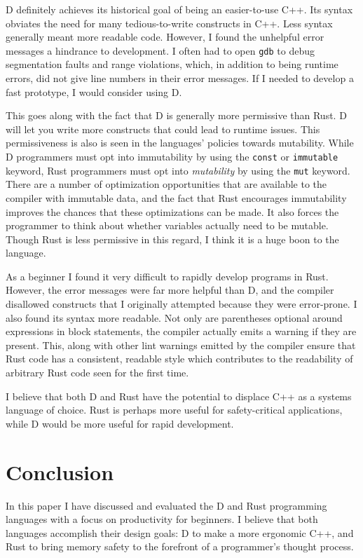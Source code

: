 \documentclass[finalcopy]{srpaper}
\begin{document}
D definitely achieves its historical goal of being an easier-to-use C++. Its
syntax obviates the need for many tedious-to-write constructs in C++. Less
syntax generally meant more readable code. However, I found the unhelpful error
messages a hindrance to development. I often had to open \texttt{gdb} to debug
segmentation faults and range violations, which, in addition to being runtime
errors, did not give line numbers in their error messages. If I needed to
develop a fast prototype, I would consider using D.

This goes along with the fact that D is generally more permissive than Rust. D
will let you write more constructs that could lead to runtime issues. This
permissiveness is also is seen in the languages' policies towards mutability.
While D programmers must opt into immutability by using the \texttt{const} or
\texttt{immutable} keyword, Rust programmers must opt into \textit{mutability}
by using the \texttt{mut} keyword. There are a number of optimization
opportunities that are available to the compiler with immutable data, and the
fact that Rust encourages immutability improves the chances that these
optimizations can be made. It also forces the programmer to think about whether
variables actually need to be mutable. Though Rust is less permissive in this
regard, I think it is a huge boon to the language.

As a beginner I found it very difficult to rapidly develop programs in Rust.
However, the error messages were far more helpful than D, and the compiler
disallowed constructs that I originally attempted because they were
error-prone. I also found its syntax more readable. Not only are parentheses
optional around expressions in block statements, the compiler actually emits a
warning if they are present. This, along with other lint warnings emitted by
the compiler ensure that Rust code has a consistent, readable style which
contributes to the readability of arbitrary Rust code seen for the first time.

I believe that both D and Rust have the potential to displace C++ as a systems
language of choice. Rust is perhaps more useful for safety-critical
applications, while D would be more useful for rapid development.

\chapter{Conclusion}

In this paper I have discussed and evaluated the D and Rust programming
languages with a focus on productivity for beginners. I believe that both
languages accomplish their design goals: D to make a more ergonomic C++, and
Rust to bring memory safety to the forefront of a programmer's thought process.
\end{document}

